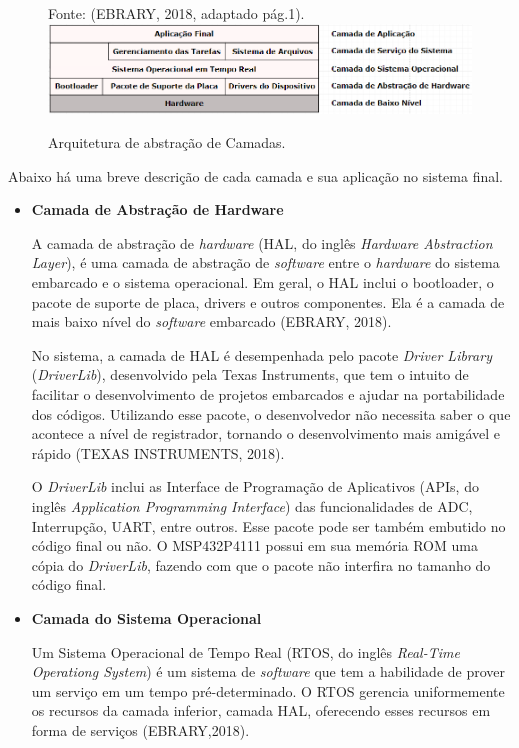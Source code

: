 \begin{figure}[h]
	\centering
	Fonte: (EBRARY, 2018,  adaptado pág.1).
	\includegraphics[keepaspectratio=true,scale=0.7]{figuras/arquiteturaSof.PNG}
	\caption{Arquitetura de abstração de Camadas.}
	\label{fig22}
\end{figure}

Abaixo há uma breve descrição de cada camada e sua aplicação no sistema final.

\begin{itemize}
\item \textbf{Camada de Abstração de Hardware} 

A camada de abstração de \textit{hardware} (HAL, do inglês \textit{Hardware Abstraction Layer}), é uma camada de abstração de \textit{software} entre o \textit{hardware} do sistema embarcado e o sistema operacional. Em geral, o HAL inclui o bootloader, o pacote de suporte de placa, drivers e outros componentes. Ela é a camada de mais baixo nível do \textit{software} embarcado (EBRARY, 2018).

No sistema, a camada de HAL é desempenhada pelo pacote \textit{Driver Library} (\textit{DriverLib}), desenvolvido pela Texas Instruments, que tem o intuito de facilitar o desenvolvimento de projetos embarcados e ajudar na portabilidade dos códigos. Utilizando esse pacote, o desenvolvedor não necessita saber o que acontece a nível de registrador, tornando o desenvolvimento mais amigável e rápido  (TEXAS INSTRUMENTS, 2018).

O \textit{DriverLib} inclui as Interface de Programação de Aplicativos (APIs, do inglês \textit{Application Programming Interface}) das funcionalidades de ADC, Interrupção, UART, entre outros. Esse pacote pode ser também embutido no código final ou não. O MSP432P4111 possui em sua memória ROM uma cópia do \textit{DriverLib}, fazendo com que o pacote não interfira no tamanho do código final.

\item \textbf{Camada do Sistema Operacional}

Um Sistema Operacional de Tempo Real (RTOS, do inglês \textit{Real-Time Operationg System}) é um sistema de \textit{software} que tem a habilidade de prover um serviço em um tempo pré-determinado. O RTOS gerencia uniformemente os recursos da camada inferior, camada HAL, oferecendo esses recursos em forma de serviços (EBRARY,2018).


\end{itemize}
